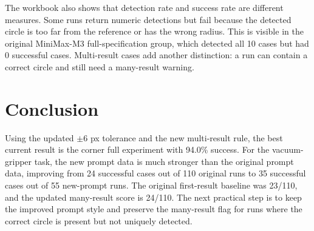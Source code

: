\documentclass[11pt,a4paper]{article}
\begin{document}
The workbook also shows that detection rate and success rate are different measures. Some runs return numeric detections but fail because the detected circle is too far from the reference or has the wrong radius. This is visible in the original MiniMax-M3 full-specification group, which detected all 10 cases but had 0 successful cases. Multi-result cases add another distinction: a run can contain a correct circle and still need a many-result warning.

\section{Conclusion}

Using the updated \(\pm 6\) px tolerance and the new multi-result rule, the best current result is the corner full experiment with 94.0\% success. For the vacuum-gripper task, the new prompt data is much stronger than the original prompt data, improving from 24 successful cases out of 110 original runs to 35 successful cases out of 55 new-prompt runs. The original first-result baseline was 23/110, and the updated many-result score is 24/110. The next practical step is to keep the improved prompt style and preserve the many-result flag for runs where the correct circle is present but not uniquely detected.
\end{document}
